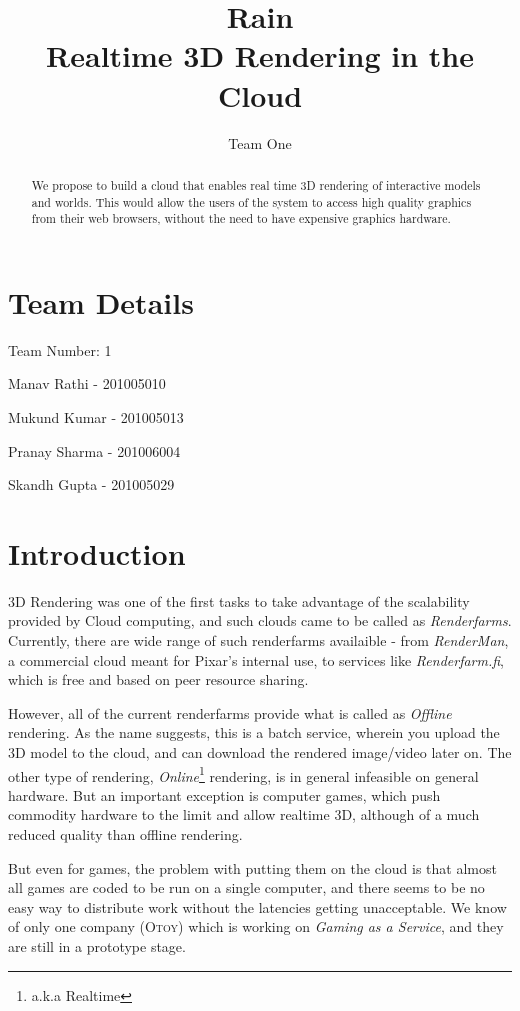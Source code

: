 \documentclass[10pt]{article}
\newenvironment{my_itemize}
{\begin{itemize}
  \setlength{\itemsep}{0pt}
  \setlength{\parskip}{0pt}
  \setlength{\parsep}{0pt}}
{\end{itemize}}
\begin{document}
\title{Rain\\
Realtime 3D Rendering in the Cloud}
\author{Team One}
\maketitle

\begin{abstract}
We propose to build a cloud that enables real time 3D rendering of interactive models and worlds. This would allow the users of the system to access high quality graphics from their web browsers, without the need to have expensive graphics hardware.
\end{abstract}

\section{Team Details}
Team Number: 1
\begin{my_itemize}
\item Manav Rathi - 201005010
\item Mukund Kumar - 201005013
\item Pranay Sharma - 201006004
\item Skandh Gupta - 201005029
\end{my_itemize}

\section{Introduction}
3D Rendering was one of the first tasks to take advantage of the scalability provided by Cloud computing, and such clouds came to be called as \emph{Renderfarms}. Currently, there are wide range of such renderfarms availaible -  from \emph{RenderMan}, a commercial cloud meant for Pixar's internal use, to services like \emph{Renderfarm.fi}\cite{rfarm}, which is free and based on peer resource sharing.

However, all of the current renderfarms provide what is called as \emph{Offline} rendering. As the name suggests, this is a batch service, wherein you upload the 3D model to the cloud, and can download the rendered image/video later on. The other type of rendering, \emph{Online}\footnote{a.k.a Realtime} rendering, is in general infeasible on general hardware. But an important exception is computer games, which push commodity hardware to the limit and allow realtime 3D, although of a much reduced quality than offline rendering. 

But even for games, the problem with putting them on the cloud is that almost all games are coded to be run on a single computer, and there seems to be no easy way to distribute work without the latencies getting unacceptable. We know of only one company (\textsc{Otoy}\cite{otoy}) which is working on \emph{Gaming as a Service}, and they are still in a prototype stage.
\end{document}
